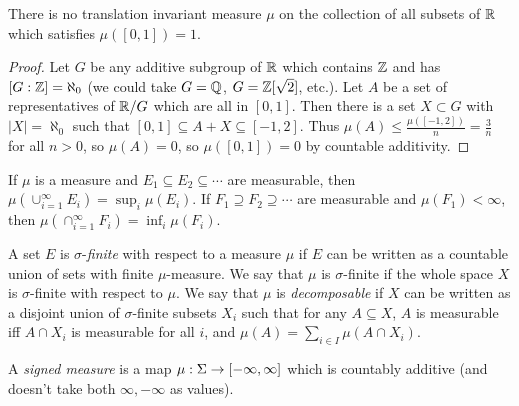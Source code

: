 \documentclass[letterpaper,11pt]{report}
\begin{document}
\begin{prop} There is no translation invariant measure $\mu$ on the collection of all subsets of $\mathbb{R}$ which satisfies $\mu([0,1]) = 1$.
\end{prop}
\begin{proof} Let $G$ be any additive subgroup of $\mathbb{R}$ which contains $\mathbb{Z}$ and has $[G:\mathbb{Z}] = \aleph_0$ (we could take $G = \mathbb{Q}$, $G = \mathbb{Z}[\sqrt{2}]$, etc.). Let $A$ be a set of representatives of $\mathbb{R}/G$ which are all in $[0,1]$. Then there is a set $X \subset G$ with $|X| = \aleph_0$ such that $[0,1] \subseteq A+X \subseteq [-1,2]$. Thus $\mu(A) \le \frac{\mu([-1,2])}{n} = \frac{3}{n}$ for all $n > 0$, so $\mu(A) = 0$, so $\mu([0,1]) = 0$ by countable additivity.
\end{proof}

\begin{prop} If $\mu$ is a measure and $E_1 \subseteq E_2 \subseteq \cdots$ are measurable, then $\mu(\cup_{i=1}^\infty E_i) = \sup_i \mu(E_i)$. If $F_1 \supseteq F_2 \supseteq \cdots$ are measurable and $\mu(F_1) < \infty$, then $\mu(\cap_{i=1}^\infty F_i) = \inf_i \mu(F_i)$.
\end{prop}

\begin{defn} A set $E$ is $\sigma$-\emph{finite} with respect to a measure $\mu$ if $E$ can be written as a countable union of sets with finite $\mu$-measure. We say that $\mu$ is $\sigma$-finite if the whole space $X$ is $\sigma$-finite with respect to $\mu$. We say that $\mu$ is \emph{decomposable} if $X$ can be written as a disjoint union of $\sigma$-finite subsets $X_i$ such that for any $A \subseteq X$, $A$ is measurable iff $A \cap X_i$ is measurable for all $i$, and $\mu(A) = \sum_{i \in I} \mu(A\cap X_i)$.
\end{defn}

\begin{defn} A \emph{signed measure} is a map $\mu:\Sigma \rightarrow [-\infty,\infty]$ which is countably additive (and doesn't take both $\infty, -\infty$ as values).
\end{defn}
\end{document}
